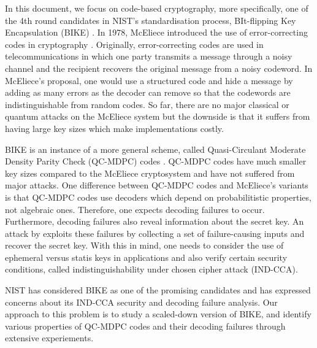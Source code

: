 In this document, we focus on code-based cryptography, more specifically, one of the 4th round candidates in NIST's standardisation process, BIt-flipping Key Encapsulation (BIKE) \cite{BIKE}. In 1978, McEliece introduced the use of error-correcting codes in cryptography \cite{mceliece}. Originally, error-correcting codes are used in telecommunications in which one party transmits a message through a noisy channel and the recipient recovers the original message from a noisy codeword. In McEliece's proposal, one would use a structured code and hide a message by adding as many errors as the decoder can remove so that the codewords are indistinguishable from random codes. So far, there are no major classical or quantum attacks on the McEliece system but the downside is that it suffers from having large key sizes which make implementations costly.

BIKE is an instance of a more general scheme, called Quasi-Circulant Moderate Density Parity Check (QC-MDPC) codes \cite{QCMDPC}. QC-MDPC codes have much smaller key sizes compared to the McEliece cryptosystem and have not suffered from major attacks. One difference between QC-MDPC codes and McEliece's variants is that QC-MDPC codes use decoders which depend on probabilitistic properties, not algebraic ones. Therefore, one expects decoding failures to occur. Furthermore, decoding failures also reveal information about the secret key. An attack by \cite{GJS} exploits these failures by collecting a set of failure-causing inputs and recover the secret key. With this in mind, one needs to consider the use of ephemeral versus statis keys in applications and also verify certain security conditions, called indistinguishability under chosen cipher attack (IND-CCA).

NIST has considered BIKE as one of the promising candidates and has expressed concerns about its IND-CCA security and decoding failure analysis. Our approach to this problem is to study a scaled-down version of BIKE, and identify various properties of QC-MDPC codes and their decoding failures through extensive experiements.